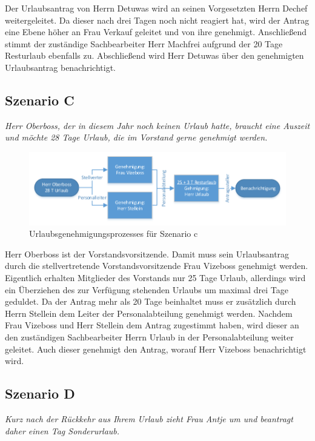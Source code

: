 Der Urlaubsantrag von Herrn Detuwas wird an seinen Vorgesetzten Herrn Dechef weitergeleitet. Da dieser nach drei Tagen noch nicht reagiert hat, wird der Antrag eine Ebene höher an Frau Verkauf geleitet und von ihre genehmigt. Anschließend stimmt der zuständige Sachbearbeiter Herr Machfrei aufgrund der 20 Tage Resturlaub ebenfalls zu. Abschließend wird Herr Detuwas über den genehmigten Urlaubsantrag benachrichtigt.

\subsection{Szenario C}
\textit{Herr Oberboss, der in diesem Jahr noch keinen Urlaub hatte, braucht eine Auszeit und möchte 28 Tage Urlaub, die im Vorstand gerne genehmigt werden.}

\begin{figure}[H]
\centering
\includegraphics[width=1.0\linewidth]{Bilder/BeispielC}
\caption{Urlaubsgenehmigungsprozesses für Szenario c}
\label{fig:BeispielC}
\end{figure}

Herr Oberboss ist der Vorstandsvorsitzende. Damit muss sein Urlaubsantrag durch die stellvertretende Vorstandsvorsitzende Frau Vizeboss genehmigt werden. Eigentlich erhalten Mitglieder des Vorstands nur 25 Tage Urlaub, allerdings wird ein Überziehen des zur Verfügung stehenden Urlaubs um maximal drei Tage geduldet. Da der Antrag mehr als 20 Tage beinhaltet muss er zusätzlich durch Herrn Stellein dem Leiter der Personalabteilung genehmigt werden. Nachdem Frau Vizeboss und Herr Stellein dem Antrag zugestimmt haben, wird dieser an den zuständigen Sachbearbeiter Herrn Urlaub in der Personalabteilung weiter geleitet. Auch dieser genehmigt den Antrag, worauf Herr Vizeboss benachrichtigt wird.

\subsection{Szenario D}
\textit{Kurz nach der Rückkehr aus Ihrem Urlaub zieht Frau Antje um und beantragt daher einen Tag Sonderurlaub.}

